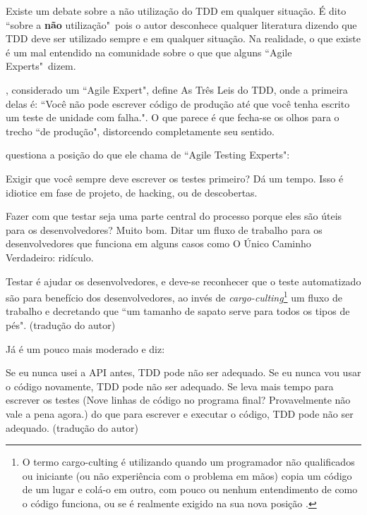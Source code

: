 Existe um debate sobre a não utilização do TDD em qualquer situação. É dito ``sobre a \textbf{não} utilização"\ pois o autor desconhece qualquer literatura dizendo que TDD deve ser utilizado sempre e em qualquer situação. Na realidade, o que existe é um mal entendido na comunidade sobre o que que alguns ``Agile Experts"\ dizem.

, considerado um ``Agile Expert", define As Três Leis do TDD, onde a primeira delas é: ``Você não pode escrever código de produção até que você tenha escrito um teste de unidade com falha.". O que parece é que fecha-se os olhos para o trecho ``de produção", distorcendo completamente seu sentido.

 questiona a posição do que ele chama de ``Agile Testing Experts":

\begin{citacao}
Exigir que você sempre deve escrever os testes primeiro? Dá um tempo. Isso é idiotice em fase de projeto, de hacking, ou de descobertas.

Fazer com que testar seja uma parte central do processo porque eles são úteis para os desenvolvedores? Muito bom. Ditar um fluxo de trabalho para os desenvolvedores que funciona em alguns casos como O Único Caminho Verdadeiro: ridículo.

Testar é ajudar os desenvolvedores, e deve-se reconhecer que o teste automatizado são para benefício dos desenvolvedores, ao invés de \textit{cargo-culting}\footnote{O termo cargo-culting é utilizando quando um programador não qualificados ou iniciante (ou não experiência com o problema em mãos) copia um código de um lugar e colá-o em outro, com pouco ou nenhum entendimento de como o código funciona, ou se é realmente exigido na sua nova posição \cite{CargoCulting}.} um fluxo de trabalho e decretando que ``um tamanho de sapato serve para todos os tipos de pés". (tradução do autor)
\end{citacao}

Já  é um pouco mais moderado e diz:

\begin{citacao}
Se eu nunca usei a API antes, TDD pode não ser adequado. Se eu nunca vou usar o código novamente, TDD pode não ser adequado. Se leva mais tempo para escrever os testes (Nove linhas de código no programa final? Provavelmente não vale a pena agora.) do que para escrever e executar o código, TDD pode não ser adequado. (tradução do autor)
\end{citacao}


